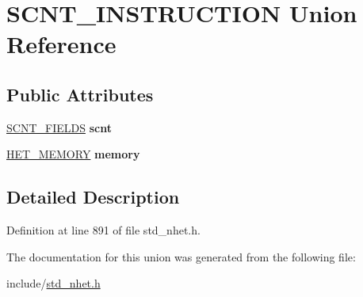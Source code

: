 \hypertarget{unionSCNT__INSTRUCTION}{}\section{S\+C\+N\+T\+\_\+\+I\+N\+S\+T\+R\+U\+C\+T\+I\+ON Union Reference}
\label{unionSCNT__INSTRUCTION}
\subsection*{Public Attributes}
\begin{DoxyCompactItemize}
\item 
\mbox{\label{unionSCNT__INSTRUCTION_abb7e0649ec12b9795d2a590ee1a9bb81}} 
\mbox{\hyperlink{structscnt__format}{S\+C\+N\+T\+\_\+\+F\+I\+E\+L\+DS}} {\bfseries scnt}
\item 
\mbox{\label{unionSCNT__INSTRUCTION_a752f66ef5f7adde37dd64ec2bdcd8ecc}} 
\mbox{\hyperlink{structmemory__format}{H\+E\+T\+\_\+\+M\+E\+M\+O\+RY}} {\bfseries memory}
\end{DoxyCompactItemize}


\subsection{Detailed Description}


Definition at line 891 of file std\+\_\+nhet.\+h.



The documentation for this union was generated from the following file\+:\begin{DoxyCompactItemize}
\item 
include/\mbox{\hyperlink{std__nhet_8h}{std\+\_\+nhet.\+h}}\end{DoxyCompactItemize}
